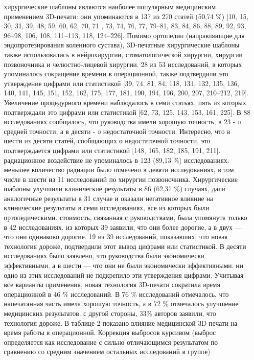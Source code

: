 хирургические шаблоны являются наиболее популярным медицинским применением
3D-печати: они упоминаются в 137 из 270 статей (50,74 \%) [10, 15, 30, 31, 39,
48, 59, 60, 62, 70, 71 , 73, 74, 76, 77, 79–81, 83, 84, 86, 88, 89, 92, 93,
96–98, 106, 108, 111–113, 118, 124–226]. Помимо ортопедии (направляющие для
эндопротезирования коленного сустава), 3D-печатные хирургические шаблоны также
использовались в нейрохирургии, стоматологической хирургии, хирургии
позвоночника и челюстно-лицевой хирургии. 28 из 53 исследований, в которых
упоминалось сокращение времени в операционной, также подтвердили это утверждение
цифрами или статистикой [39, 74, 81, 84, 118, 131, 132, 135, 136, 140, 141, 145,
151, 152, 162, 175, 177, 181, 190, 194, 196, 200, 207, 210–212, 219]. Увеличение
процедурного времени наблюдалось в семи статьях, пять из которых подтверждали
это цифрами или статистикой [62, 73, 125, 143, 153, 161, 225]. В 88
исследованиях сообщалось, что руководства имели хорошую точность, в 23 - о
средней точности, а в десяти - о недостаточной точности. Интересно, что в шести
из десяти статей, сообщающих о недостаточной точности, это подтверждается
цифрами или статистикой [148, 165, 182, 185, 191, 211]. радиационное воздействие
не упоминалось в 123 (89,13 \%) исследованиях. меньшее количество радиации было
отмечено в девяти исследованиях, в том числе в шести из 11 исследований по
хирургии позвоночника. Хирургические шаблоны улучшили клинические результаты в
86 (62,31 \%) случаях, дали аналогичные результаты в 31 случае и оказали
негативное влияние на клинические результаты в семи исследованиях, все из
которых были ортопедическими. стоимость, связанная с руководствами, была
упомянута только в 42 исследованиях, из которых 39 заявили, что они более
дорогие, а в двух — что они одинаково дорогие. 19 из 39 исследований,
показавших, что новая технология дороже, подтвердили этот вывод цифрами или
статистикой. В десяти исследованиях было заявлено, что руководства были
экономически эффективными, а в шести — что они не были экономически
эффективными. ни одно из этих исследований не подкрепило эти утверждения
цифрами. Учитывая все варианты применения, новая технология 3D-печати сократила
время операционной в 46 \% исследований. В 76 \% исследований отмечалось, что
напечатанная часть имела хорошую точность, а в 72 \% отмечалось улучшение
медицинских результатов. с другой стороны, 33\% авторов заявили, что технология
дороже. В таблице 2 показано влияние медицинской 3D-печати на время работы в
операционной. Коррекция выбросов курсивом (выброс определяется как исследование
с сильно отличающимся результатом по сравнению со средним значением остальных
исследований в группе)

